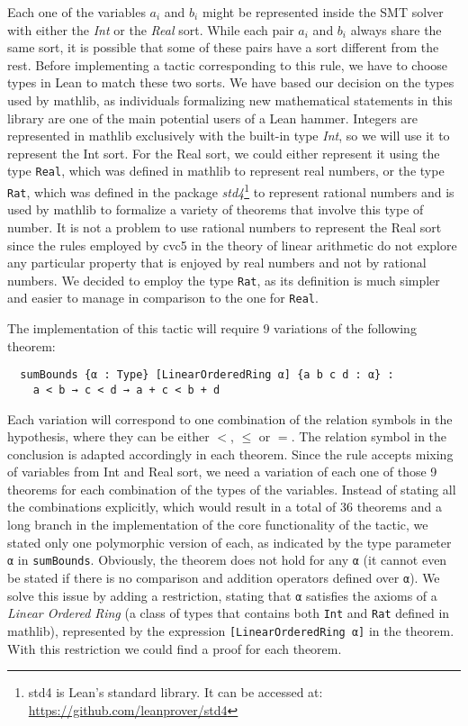 Each one of the variables $a_{i}$ and $b_{i}$ might be represented inside the SMT solver
with either the \textit{Int} or the \textit{Real} sort. While each pair $a_{i}$ and $b_{i}$ always share the same sort, it is possible that some of these pairs have a sort different from the rest. Before implementing a
tactic corresponding to this rule, we have to choose types in Lean to match
these two sorts. We have based our decision on the types used by mathlib, as
individuals formalizing new mathematical statements in this library are one of the main potential users
of a Lean hammer. Integers are represented in mathlib exclusively with the built-in type \textit{Int}, so we will use it to represent the Int sort.
For the Real sort, we could either represent it using the type \texttt{Real}, which was defined in mathlib
to represent real numbers, or the type \texttt{Rat}, which was defined in the package \textit{std4}\footnote{std4 is Lean's standard library. It can be accessed at: \url{https://github.com/leanprover/std4}} to
represent rational numbers and is used by mathlib to formalize a variety of theorems
that involve this type of number.
It is not a problem to use rational numbers to represent the Real sort since the rules employed by cvc5 in the theory of linear arithmetic
do not explore any particular property that is enjoyed by real numbers and not by
rational numbers.
We decided to employ the type \texttt{Rat}, as its definition is much simpler and easier
to manage in comparison to the one for \texttt{Real}.

The implementation of this tactic will require 9 variations of the following theorem:

\begin{verbatim}
  sumBounds {α : Type} [LinearOrderedRing α] {a b c d : α} :
    a < b → c < d → a + c < b + d
\end{verbatim}

Each variation will correspond to one combination of the relation symbols in the hypothesis, where
they can be either $<$, $\le$ or $=$. The relation symbol in the
conclusion is adapted accordingly in each theorem. Since the rule accepts mixing of variables
from Int and Real sort, we need a variation of each one of those 9 theorems for each combination
of the types of the variables. Instead of stating all the combinations explicitly, which would
result in a total of 36 theorems and a long branch in the implementation of the core functionality of the tactic,
we stated only one polymorphic version of each, as indicated by the type parameter \texttt{α} in \texttt{sumBounds}.
Obviously, the theorem does not hold
for any \texttt{α} (it cannot even be stated if there is no comparison and addition operators defined over \texttt{α}).
We solve this issue by adding a restriction, stating that \texttt{α} satisfies the axioms of a
\textit{Linear Ordered Ring} (a class of types that contains both \texttt{Int} and \texttt{Rat} defined in mathlib), represented by the expression \texttt{[LinearOrderedRing α]} in the theorem. With this restriction we
could find a proof for each theorem.

